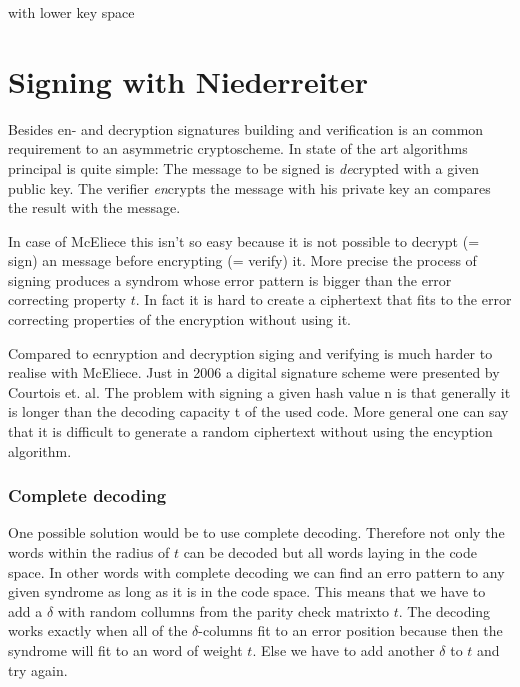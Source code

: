 

with lower key space


\section{Signing with Niederreiter}
\label{signature}
Besides en- and decryption signatures building and verification is an common requirement to an asymmetric cryptoscheme. In state of the art algorithms principal is quite simple: The message to be signed is \textit{de}crypted with a given public key. The verifier \textit{en}crypts the message with his private key an compares the result with the message. 

In case of McEliece this isn't so easy because it is not possible to decrypt (= sign) an message before encrypting (= verify) it. More precise the process of signing produces a syndrom whose  error pattern is bigger than the error correcting property $t$. In fact it is hard to create a ciphertext that fits to the error correcting properties of the encryption without using it. 


Compared to ecnryption and decryption siging and verifying is much harder to realise with McEliece. Just in 2006 a digital signature scheme were presented by Courtois et. al. 
The problem with signing a given hash value n is that generally it is longer than the decoding capacity t of the used code. More general one can say that it is difficult to generate a random ciphertext without using the encyption algorithm. \cite{courtois2001achieve}


\subsubsection*{Complete decoding}
One possible solution would be to use complete decoding. Therefore not only the words within the radius of $t$ can be decoded but all words laying in the code space. In other words with complete decoding we can find an erro pattern to any given syndrome as long as it is in the code space. This means that we have to add a $\delta$ with random collumns from the parity check matrixto $t$. The decoding works exactly when all of the $\delta$-columns fit to an error position because then the syndrome will fit to an word of weight $t$. Else we have to add another $\delta$ to $t$ and try again.

